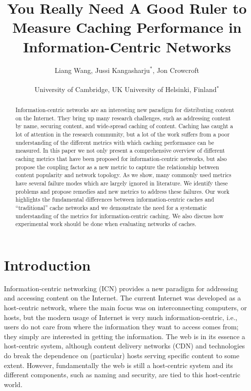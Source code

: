 \documentclass{sigcomm-alternate}
\title{You Really Need A Good Ruler to Measure Caching Performance in Information-Centric Networks}
\author{Liang Wang, Jussi Kangasharju$^*$, Jon Crowcroft\\ \\University of Cambridge, UK \qquad University of Helsinki, Finland$^*$}
\begin{document}
\maketitle

\begin{abstract}
  Information-centric networks are an interesting new paradigm for distributing content on the Internet.
  They bring up many research challenges, such as addressing content by name, securing content, and wide-spread caching of content.
  Caching has caught a lot of attention in the research community, but a lot of the work suffers from a poor understanding of the different metrics with which caching performance can be measured.
  In this paper we not only present a comprehensive overview of different caching metrics that have been proposed for information-centric networks, but also propose the coupling factor as a new metric to capture the relationship between content popularity and network topology.
  As we show, many commonly used metrics have several failure modes which are largely ignored in literature.
  We identify these problems and propose remedies and new metrics to address these failures.
  Our work highlights the fundamental differences between information-centric caches and ``traditional'' cache networks and we demonstrate the need for a systematic understanding of the metrics for information-centric caching.
  We also discuss how experimental work should be done when evaluating networks of caches.
\end{abstract}


\section{Introduction}
\label{sec:intro}





Information-centric networking (ICN) provides a new paradigm for addressing and accessing content on the Internet.
The current Internet was developed as a host-centric network, where the main focus was on interconnecting computers, or hosts, but the modern usage of Internet is very much information-centric, i.e., users do not care from where the information they want to access comes from; they simply are interested in getting the information.
The web is in its essence a host-centric system, although content delivery networks (CDN) and technologies do break the dependence on (particular) hosts serving specific content to some extent.
However, fundamentally the web is still a host-centric system and its different components, such as naming and security, are tied to this host-centric world.
\end{document}
